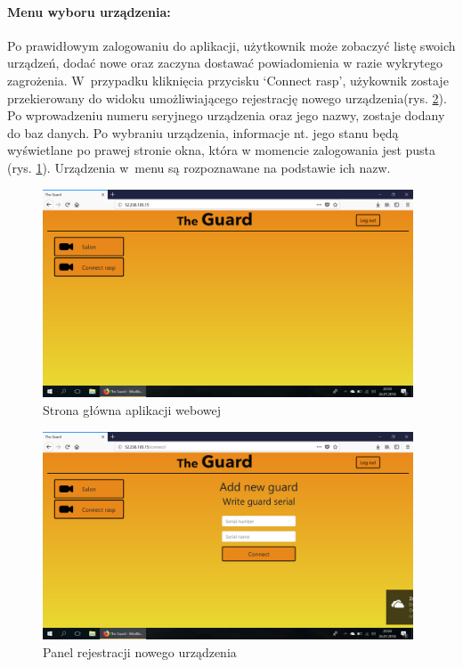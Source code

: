 \paragraph{Menu wyboru urządzenia:} Po prawidłowym zalogowaniu do aplikacji, użytkownik może zobaczyć listę swoich urządzeń, dodać nowe oraz zaczyna dostawać powiadomienia w razie wykrytego zagrożenia. W~przypadku kliknięcia przycisku `Connect rasp', użykownik zostaje przekierowany do widoku umożliwiającego rejestrację nowego urządzenia(rys. \ref{web_register}). Po wprowadzeniu numeru seryjnego urządzenia oraz jego nazwy, zostaje dodany do baz danych. Po wybraniu urządzenia, informacje nt. jego stanu będą wyświetlane po prawej stronie okna, która w momencie zalogowania jest pusta (rys. \ref{web_main_page}). Urządzenia w~menu są rozpoznawane na podstawie ich nazw. 

\begin{figure}[ht]
	\centering
	\includegraphics[width=11cm]{web_screenshots/main.png}
	\caption{Strona główna aplikacji webowej}
	\label{web_main_page}
\end{figure}


\begin{figure}[ht]
	\centering
	\includegraphics[width=11cm]{web_screenshots/add_rasp.png}
	\caption{Panel rejestracji nowego urządzenia}
	\label{web_register}
\end{figure}

